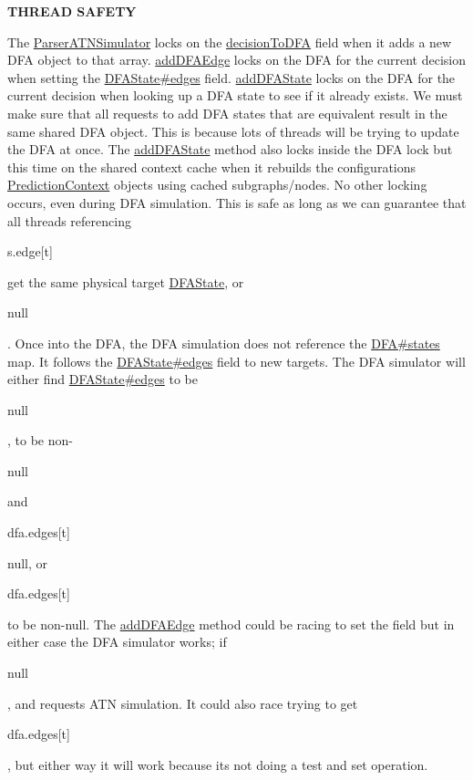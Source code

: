 {\bfseries T\+H\+R\+E\+AD S\+A\+F\+E\+TY}

The \hyperlink{classantlr4_1_1atn_1_1ParserATNSimulator}{Parser\+A\+T\+N\+Simulator} locks on the \hyperlink{}{decision\+To\+D\+FA} field when it adds a new D\+FA object to that array. \hyperlink{}{add\+D\+F\+A\+Edge} locks on the D\+FA for the current decision when setting the \hyperlink{}{D\+F\+A\+State\#edges} field. \hyperlink{}{add\+D\+F\+A\+State} locks on the D\+FA for the current decision when looking up a D\+FA state to see if it already exists. We must make sure that all requests to add D\+FA states that are equivalent result in the same shared D\+FA object. This is because lots of threads will be trying to update the D\+FA at once. The \hyperlink{}{add\+D\+F\+A\+State} method also locks inside the D\+FA lock but this time on the shared context cache when it rebuilds the configurations\textquotesingle{} \hyperlink{classantlr4_1_1atn_1_1PredictionContext}{Prediction\+Context} objects using cached subgraphs/nodes. No other locking occurs, even during D\+FA simulation. This is safe as long as we can guarantee that all threads referencing 
\begin{DoxyCode}
s.edge[t] 
\end{DoxyCode}
 get the same physical target \hyperlink{}{D\+F\+A\+State}, or 
\begin{DoxyCode}
null 
\end{DoxyCode}
 . Once into the D\+FA, the D\+FA simulation does not reference the \hyperlink{}{D\+F\+A\#states} map. It follows the \hyperlink{}{D\+F\+A\+State\#edges} field to new targets. The D\+FA simulator will either find \hyperlink{}{D\+F\+A\+State\#edges} to be 
\begin{DoxyCode}
null 
\end{DoxyCode}
 , to be non-\/
\begin{DoxyCode}
null 
\end{DoxyCode}
 and
\begin{DoxyCode}
dfa.edges[t] 
\end{DoxyCode}
 null, or 
\begin{DoxyCode}
dfa.edges[t] 
\end{DoxyCode}
 to be non-\/null. The \hyperlink{}{add\+D\+F\+A\+Edge} method could be racing to set the field but in either case the D\+FA simulator works; if
\begin{DoxyCode}
null 
\end{DoxyCode}
 , and requests A\+TN simulation. It could also race trying to get
\begin{DoxyCode}
dfa.edges[t] 
\end{DoxyCode}
 , but either way it will work because it\textquotesingle{}s not doing a test and set operation.

